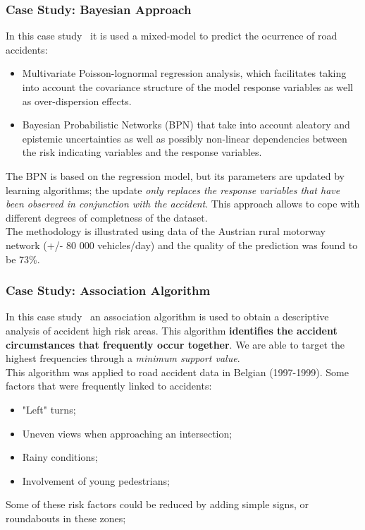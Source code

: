 \documentclass[hyperref={pdfpagelabels=true}]{beamer}
\begin{document}
\begin{frame}
\frametitle{Case Study: Bayesian Approach}
In this case study~\cite{bayesian} it is used a mixed-model to predict the ocurrence of road accidents:
\small{
\begin{itemize}
\item Multivariate Poisson-lognormal regression analysis, which facilitates taking into account the covariance structure of the model response variables as well as
over-dispersion effects.
\item Bayesian Probabilistic Networks (BPN) that take into account aleatory and epistemic uncertainties as well as possibly non-linear dependencies between the risk indicating variables and the response variables.
\end{itemize}
}
The BPN is based on the regression model, but its parameters are updated by learning algorithms; the update \textit{only replaces the response variables that have been observed in conjunction with the accident}. This approach allows to cope with different degrees of completness of the dataset.\\
The methodology is illustrated using data of the Austrian rural motorway network (+/- 80 000 vehicles/day) and the quality of the prediction was found to be 73\%.
\end{frame}

\begin{frame}
\frametitle{Case Study: Association Algorithm}
In this case study~\cite{sets} an association algorithm is used to obtain a descriptive analysis of accident high risk areas. This algorithm \textbf{identifies the accident circumstances that frequently occur together}. We are able to target the highest frequencies through a \textit{minimum support value}.\\
This algorithm was applied to road accident data in Belgian (1997-1999). 
Some factors that were frequently linked to accidents:
\begin{itemize}
\item "Left" turns;
\item Uneven views when approaching an intersection;
\item Rainy conditions;
\item Involvement of young pedestrians;
\end{itemize}
Some of these risk factors could be reduced by adding simple signs, or roundabouts in these zones;
\end{frame}
\end{document}
